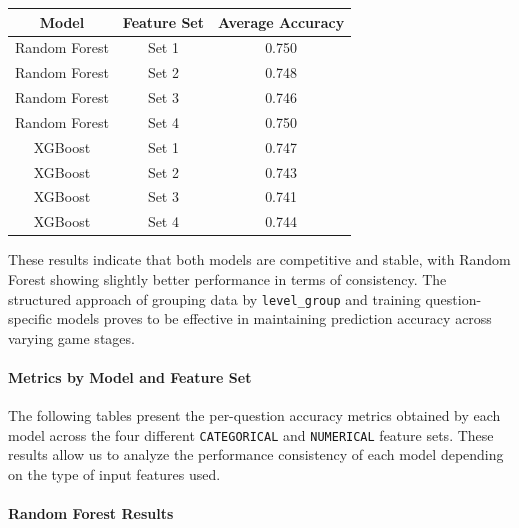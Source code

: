 \documentclass[12pt]{article}
\begin{document}
	\begin{center}
		\begin{tabular}{|c|c|c|}
			\hline
			\textbf{Model} & \textbf{Feature Set} & \textbf{Average Accuracy} \\
			\hline
			Random Forest & Set 1 & 0.750 \\
			Random Forest & Set 2 & 0.748 \\
			Random Forest & Set 3 & 0.746 \\
			Random Forest & Set 4 & 0.750 \\
			\hline
			XGBoost       & Set 1 & 0.747 \\
			XGBoost       & Set 2 & 0.743 \\
			XGBoost       & Set 3 & 0.741 \\
			XGBoost       & Set 4 & 0.744 \\
			\hline
		\end{tabular}
	\end{center}
	
	\vspace{0.5em}
	These results indicate that both models are competitive and stable, with Random Forest showing slightly better performance in terms of consistency. The structured approach of grouping data by \texttt{level\_group} and training question-specific models proves to be effective in maintaining prediction accuracy across varying game stages.
	
	\paragraph{Metrics by Model and Feature Set}
	
	The following tables present the per-question accuracy metrics obtained by each model across the four different \texttt{CATEGORICAL} and \texttt{NUMERICAL} feature sets. These results allow us to analyze the performance consistency of each model depending on the type of input features used.
	
	\paragraph{Random Forest Results}\mbox{}\\
	
\end{document}
